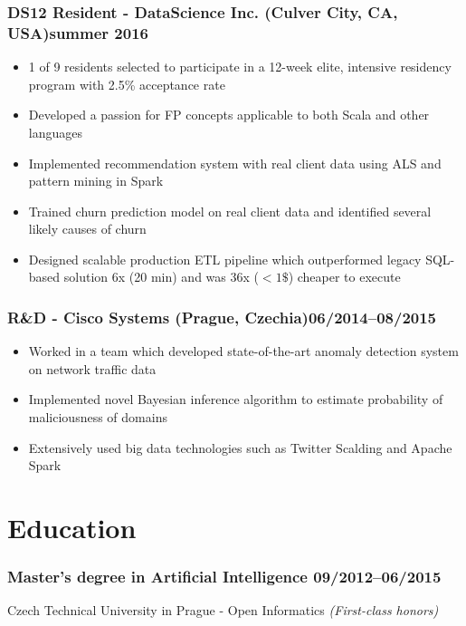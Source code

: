 \documentclass[11pt]{article}
\begin{document}
\subsubsection*{\bf DS12 Resident - DataScience Inc. (Culver City, CA, USA)\hfill summer 2016}
	 \begin{itemize}
		\setlength\itemsep{-0.25em}
		\item 1 of 9 residents selected to participate in a 12-week elite, intensive residency program with 2.5\% acceptance rate
		\item Developed a passion for FP concepts applicable to both Scala and other languages
		\item Implemented recommendation system with real client data using ALS and pattern mining in Spark
		\item Trained churn prediction model on real client data and identified several likely causes of churn
		\item Designed scalable production ETL pipeline which outperformed legacy SQL-based solution 6x (20 min) and was 36x ($< 1\$$) cheaper to execute
	 \end{itemize}

\subsubsection*{R\&D - Cisco Systems (Prague, Czechia)\hfill 06/2014--08/2015}
	 \begin{itemize}
		\setlength\itemsep{-0.25em}
		\item Worked in a team which developed state-of-the-art anomaly detection system on network traffic data
		\item Implemented novel Bayesian inference algorithm to estimate probability of maliciousness of domains
		\item Extensively used big data technologies such as Twitter Scalding and Apache Spark
	 \end{itemize}

\section*{Education}
\subsubsection*{\bf Master’s degree in Artificial Intelligence \hfill 09/2012--06/2015}
\vspace{-1.5mm}
Czech Technical University in Prague - Open Informatics \textit{(First-class honors)}
\vspace{-1.5mm}
\end{document}
